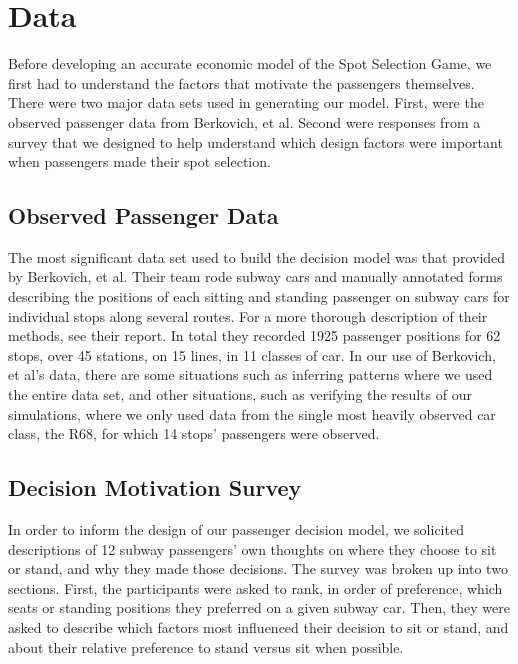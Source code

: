 \documentclass{acm_proc_article-sp}
\begin{document}
\section{Data}
Before developing an accurate economic model of the Spot Selection Game, we first had to understand the factors that motivate the passengers themselves. There were two major data sets used in generating our model. First, were the observed passenger data from Berkovich, et al. Second were responses from a survey that we designed to help understand which design factors were important when passengers made their spot selection.

\subsection{Observed Passenger Data}
The most significant data set used to build the decision model was that provided by Berkovich, et al. Their team rode subway cars and manually annotated forms describing the positions of each sitting and standing passenger on subway cars for individual stops along several routes. For a more thorough description of their methods, see their report\cite{berkovich2013observed}. In total they recorded 1925 passenger positions for 62 stops, over 45 stations, on 15 lines, in 11 classes of car. In our use of Berkovich, et al's data, there are some situations such as inferring patterns where we used the entire data set, and other situations, such as verifying the results of our simulations, where we only used data from the single most heavily observed car class, the R68, for which 14 stops' passengers were observed.

\subsection{Decision Motivation Survey}
In order to inform the design of our passenger decision model, we solicited descriptions of 12 subway passengers' own thoughts on where they choose to sit or stand, and why they made those decisions. The survey was broken up into two sections. First, the participants were asked to rank, in order of preference, which seats or standing positions they preferred on a given subway car. Then, they were asked to describe which factors most influenced their decision to sit or stand, and about their relative preference to stand versus sit when possible.
\end{document}
